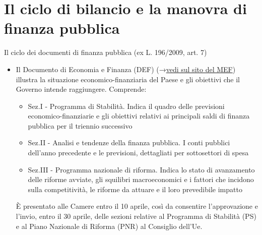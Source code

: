 \documentclass[aspectratio=149,11pt,italian]{beamer}
\begin{document}
\section{Il ciclo di bilancio e la manovra di finanza pubblica}

\begin{frame}{Il ciclo dei documenti di finanza pubblica (ex L. 196/2009, art. 7)}
\begin{itemize}
\item Il \alert{Documento di Economia e Finanza (DEF)} (→\href{http://www.mef.gov.it/documenti-pubblicazioni/doc-finanza-pubblica/index.html}{vedi sul sito del MEF}) illustra
la situazione economico-finanziaria del Paese e gli obiettivi che il Governo
intende raggiungere. Comprende:
\begin{itemize}
\item \alert{Sez.I - Programma di Stabilità}. Indica il quadro delle previsioni
economico-finanziarie e gli obiettivi relativi ai principali saldi di
finanza pubblica per il triennio successivo
\item \alert{Sez.II - Analisi e tendenze della finanza pubblica.} I conti pubblici
dell'anno precedente e le previsioni, dettagliati per sottosettori di
spesa
\item \alert{Sez.III - Programma nazionale di riforma.} Indica lo stato di
avanzamento delle riforme avviate, gli squilibri macroeconomici e i
fattori che incidono sulla competitività, le riforme da attuare e il
loro prevedibile impatto
\end{itemize}
È presentato alle Camere entro il 10 aprile, così da
consentire l’approvazione e l’invio, entro il 30 aprile, delle sezioni
relative al Programma di Stabilità (PS) e al Piano Nazionale di Riforma
(PNR) al Consiglio dell’Ue.
\end{itemize}
\end{frame}
\end{document}
